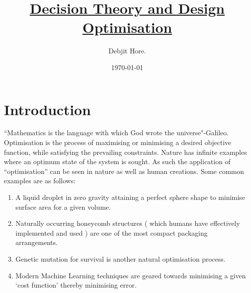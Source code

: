 \documentclass[12pt,a4paper,titlepage]{article}
\title{\Huge \underline{ Decision Theory and Design Optimisation}}
\author{Debjit Hore.}
\date{\today}
\begin{document}
\maketitle
\mbox{}
\printnomenclature

\clearpage
\tableofcontents

\clearpage
\section{Introduction}
``Mathematics is the language with which God wrote the universe"-Galileo.\\[1\baselineskip]
Optimisation is the process of maximising or minimising a desired objective function, while satisfying the prevailing constraints. Nature has infinite examples where an optimum state of the system is sought. As such the application of ``optimisation'' can be seen in nature as well as human creations. Some common examples are as follows:
{\begin{enumerate}
    \item A liquid droplet in zero gravity attaining a perfect sphere shape to minimise surface area for a given volume.
    \item Naturally occurring honeycomb structures ( which humans have effectively implemented and used ) are one of the most compact packaging arrangements.\
    \item Genetic mutation for survival is another natural optimisation process.
    \item Modern Machine Learning techniques are geared towards minimising a given `cost function' thereby minimising error.
\end{enumerate}}
\end{document}
